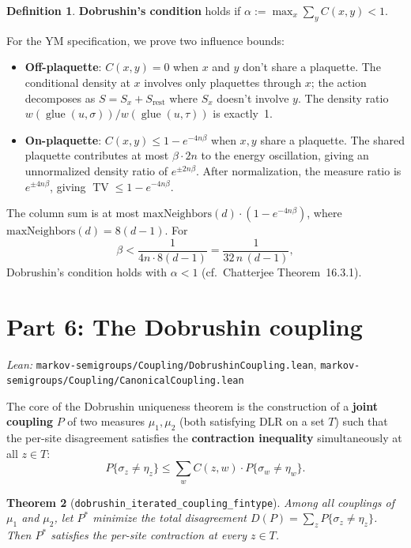 \documentclass[11pt,a4paper]{article}
\newtheorem{theorem}{Theorem}
\theoremstyle{definition}
\newtheorem{definition}[theorem]{Definition}
\newcommand{\TV}{\operatorname{TV}}
\newcommand{\glue}{\operatorname{glue}}
\begin{document}
\begin{definition}
\textbf{Dobrushin's condition} holds if
$\alpha := \max_x \sum_y C(x, y) < 1$.
\end{definition}

For the YM specification, we prove two influence bounds:

\begin{itemize}
\item \textbf{Off-plaquette}: $C(x, y) = 0$ when $x$ and $y$
  don't share a plaquette. The conditional density at $x$ involves
  only plaquettes through $x$; the action decomposes as
  $S = S_x + S_{\text{rest}}$ where $S_x$ doesn't involve $y$.
  The density ratio $w(\glue(u, \sigma))/w(\glue(u, \tau))$ is
  exactly~1.

\item \textbf{On-plaquette}:
  $C(x, y) \leq 1 - e^{-4n\beta}$ when $x, y$ share a plaquette.
  The shared plaquette contributes at most $\beta \cdot 2n$ to the
  energy oscillation, giving an unnormalized density ratio of
  $e^{\pm 2n\beta}$. After normalization, the measure ratio is
  $e^{\pm 4n\beta}$, giving $\TV \leq 1 - e^{-4n\beta}$.
\end{itemize}

The column sum is at most $\text{maxNeighbors}(d) \cdot (1 - e^{-4n\beta})$,
where $\text{maxNeighbors}(d) = 8(d{-}1)$. For
\[
  \beta < \frac{1}{4n \cdot 8(d{-}1)} = \frac{1}{32\,n\,(d{-}1)},
\]
Dobrushin's condition holds with $\alpha < 1$
(cf.\ Chatterjee Theorem~16.3.1).

\section{Part 6: The Dobrushin coupling}

\textit{Lean:} \texttt{markov-semigroups/Coupling/DobrushinCoupling.lean},
\texttt{markov-semigroups/Coupling/CanonicalCoupling.lean}

\medskip

The core of the Dobrushin uniqueness theorem is the construction
of a \textbf{joint coupling} $P$ of two measures $\mu_1, \mu_2$
(both satisfying DLR on a set $T$) such that the per-site
disagreement satisfies the \textbf{contraction inequality}
simultaneously at all $z \in T$:
\[
  P\{\sigma_z \neq \eta_z\}
  \leq \sum_w C(z, w) \cdot P\{\sigma_w \neq \eta_w\}.
\]

\begin{theorem}[\texttt{dobrushin\_iterated\_coupling\_fintype}]
Among all couplings of $\mu_1$ and $\mu_2$, let $P^*$ minimize
the total disagreement $D(P) = \sum_z P\{\sigma_z \neq \eta_z\}$.
Then $P^*$ satisfies the per-site contraction at every $z \in T$.
\end{theorem}
\end{document}
